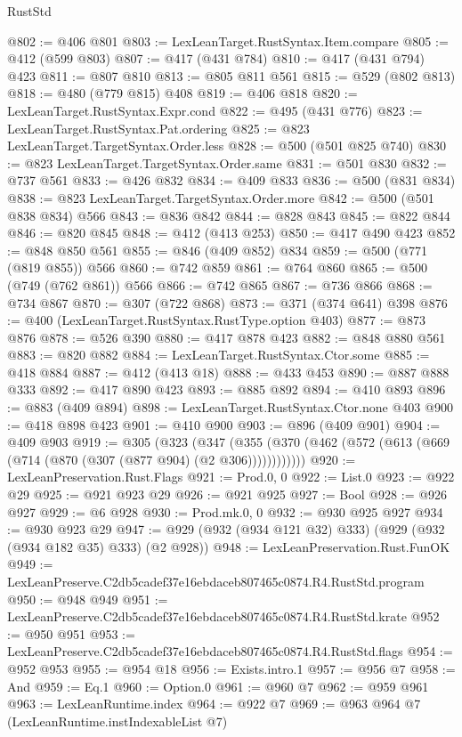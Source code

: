 \begin{lexlean}{RustStd}
\begin{coremodule}
@802 := @406 @801
@803 := LexLeanTarget.RustSyntax.Item.compare
@805 := @412 (@599 @803)
@807 := @417 (@431 @784)
@810 := @417 (@431 @794) @423
@811 := @807 @810
@813 := @805 @811 @561
@815 := @529 (@802 @813)
@818 := @480 (@779 @815) @408
@819 := @406 @818
@820 := LexLeanTarget.RustSyntax.Expr.cond
@822 := @495 (@431 @776)
@823 := LexLeanTarget.RustSyntax.Pat.ordering
@825 := @823 LexLeanTarget.TargetSyntax.Order.less
@828 := @500 (@501 @825 @740)
@830 := @823 LexLeanTarget.TargetSyntax.Order.same
@831 := @501 @830
@832 := @737 @561
@833 := @426 @832
@834 := @409 @833
@836 := @500 (@831 @834)
@838 := @823 LexLeanTarget.TargetSyntax.Order.more
@842 := @500 (@501 @838 @834) @566
@843 := @836 @842
@844 := @828 @843
@845 := @822 @844
@846 := @820 @845
@848 := @412 (@413 @253)
@850 := @417 @490 @423
@852 := @848 @850 @561
@855 := @846 (@409 @852) @834
@859 := @500 (@771 (@819 @855)) @566
@860 := @742 @859
@861 := @764 @860
@865 := @500 (@749 (@762 @861)) @566
@866 := @742 @865
@867 := @736 @866
@868 := @734 @867
@870 := @307 (@722 @868)
@873 := @371 (@374 @641) @398
@876 := @400 (LexLeanTarget.RustSyntax.RustType.option @403)
@877 := @873 @876
@878 := @526 @390
@880 := @417 @878 @423
@882 := @848 @880 @561
@883 := @820 @882
@884 := LexLeanTarget.RustSyntax.Ctor.some
@885 := @418 @884
@887 := @412 (@413 @18)
@888 := @433 @453
@890 := @887 @888 @333
@892 := @417 @890 @423
@893 := @885 @892
@894 := @410 @893
@896 := @883 (@409 @894)
@898 := LexLeanTarget.RustSyntax.Ctor.none @403
@900 := @418 @898 @423
@901 := @410 @900
@903 := @896 (@409 @901)
@904 := @409 @903
@919 := @305
    (@323
      (@347 (@355 (@370 (@462 (@572 (@613 (@669 (@714 (@870 (@307 (@877 @904) (@2 @306))))))))))))
@920 := LexLeanPreservation.Rust.Flags
@921 := Prod.{0, 0}
@922 := List.{0}
@923 := @922 @29
@925 := @921 @923 @29
@926 := @921 @925
@927 := Bool
@928 := @926 @927
@929 := @6 @928
@930 := Prod.mk.{0, 0}
@932 := @930 @925 @927
@934 := @930 @923 @29
@947 := @929 (@932 (@934 @121 @32) @333) (@929 (@932 (@934 @182 @35) @333) (@2 @928))
@948 := LexLeanPreservation.Rust.FunOK
@949 := LexLeanPreserve.C2db5cadef37e16ebdaceb807465c0874.R4.RustStd.program
@950 := @948 @949
@951 := LexLeanPreserve.C2db5cadef37e16ebdaceb807465c0874.R4.RustStd.krate
@952 := @950 @951
@953 := LexLeanPreserve.C2db5cadef37e16ebdaceb807465c0874.R4.RustStd.flags
@954 := @952 @953
@955 := @954 @18
@956 := Exists.intro.{1}
@957 := @956 @7
@958 := And
@959 := Eq.{1}
@960 := Option.{0}
@961 := @960 @7
@962 := @959 @961
@963 := LexLeanRuntime.index
@964 := @922 @7
@969 := @963 @964 @7 (LexLeanRuntime.instIndexableList @7)

\end{coremodule}
\end{lexlean}

